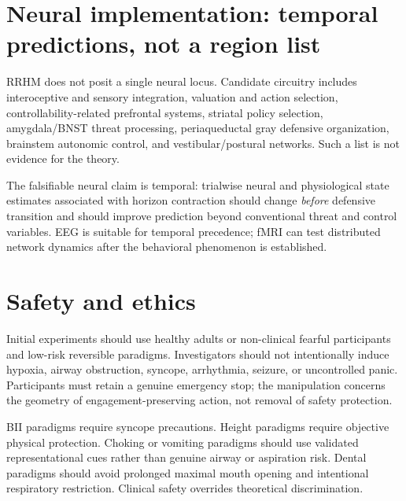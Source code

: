 \documentclass[9pt,twocolumn]{article}
\begin{document}
\section{Neural implementation: temporal predictions, not a region list}
RRHM does not posit a single neural locus. Candidate circuitry includes interoceptive and sensory integration, valuation and action selection, controllability-related prefrontal systems, striatal policy selection, amygdala/BNST threat processing, periaqueductal gray defensive organization, brainstem autonomic control, and vestibular/postural networks. Such a list is not evidence for the theory.

The falsifiable neural claim is temporal: trialwise neural and physiological state estimates associated with horizon contraction should change \emph{before} defensive transition and should improve prediction beyond conventional threat and control variables. EEG is suitable for temporal precedence; fMRI can test distributed network dynamics after the behavioral phenomenon is established.

\section{Safety and ethics}
Initial experiments should use healthy adults or non-clinical fearful participants and low-risk reversible paradigms. Investigators should not intentionally induce hypoxia, airway obstruction, syncope, arrhythmia, seizure, or uncontrolled panic. Participants must retain a genuine emergency stop; the manipulation concerns the geometry of engagement-preserving action, not removal of safety protection.

BII paradigms require syncope precautions. Height paradigms require objective physical protection. Choking or vomiting paradigms should use validated representational cues rather than genuine airway or aspiration risk. Dental paradigms should avoid prolonged maximal mouth opening and intentional respiratory restriction. Clinical safety overrides theoretical discrimination.
\end{document}
